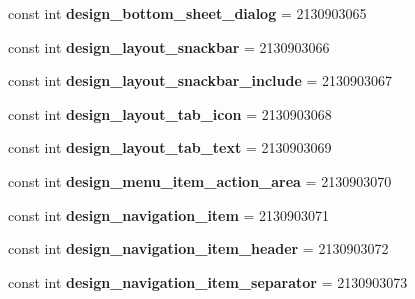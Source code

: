 \begin{DoxyCompactItemize}
\mbox{\label{classXaria_1_1Resource_1_1Layout_a34938d84455be6c6c81753090f47c8a3}} 
const int {\bfseries design\+\_\+bottom\+\_\+sheet\+\_\+dialog} = 2130903065
\item 
\mbox{\label{classXaria_1_1Resource_1_1Layout_a64cad325fbe222d4334c20eff683be03}} 
const int {\bfseries design\+\_\+layout\+\_\+snackbar} = 2130903066
\item 
\mbox{\label{classXaria_1_1Resource_1_1Layout_a303037d0f7543ea4a61a185a34274efc}} 
const int {\bfseries design\+\_\+layout\+\_\+snackbar\+\_\+include} = 2130903067
\item 
\mbox{\label{classXaria_1_1Resource_1_1Layout_a987401fdee2af58a91b486166c6c4f40}} 
const int {\bfseries design\+\_\+layout\+\_\+tab\+\_\+icon} = 2130903068
\item 
\mbox{\label{classXaria_1_1Resource_1_1Layout_abdf703ddb2836a9300487d4d3f8f8903}} 
const int {\bfseries design\+\_\+layout\+\_\+tab\+\_\+text} = 2130903069
\item 
\mbox{\label{classXaria_1_1Resource_1_1Layout_abac9119e8fec8ccb992d977775aa24f5}} 
const int {\bfseries design\+\_\+menu\+\_\+item\+\_\+action\+\_\+area} = 2130903070
\item 
\mbox{\label{classXaria_1_1Resource_1_1Layout_a6481ae96c543b91012e09710b362d789}} 
const int {\bfseries design\+\_\+navigation\+\_\+item} = 2130903071
\item 
\mbox{\label{classXaria_1_1Resource_1_1Layout_a3f146115a10eb8cfa6476bb63e841d26}} 
const int {\bfseries design\+\_\+navigation\+\_\+item\+\_\+header} = 2130903072
\item 
\mbox{\label{classXaria_1_1Resource_1_1Layout_a0a0d616f8ed0e08d8506f60d8c6c84d6}} 
const int {\bfseries design\+\_\+navigation\+\_\+item\+\_\+separator} = 2130903073
\item 
\mbox{\label{classXaria_1_1Resource_1_1Layout_a4fc9befc9c310eb7058238c4a30af11f}} 

\end{DoxyCompactItemize}
